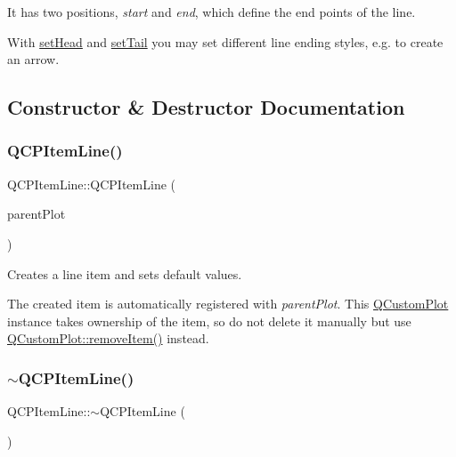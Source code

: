  It has two positions, {\itshape start} and {\itshape end}, which define the end points of the line.

With \hyperlink{class_q_c_p_item_line_aebf3d687114d584e0459db6759e2c3c3}{set\+Head} and \hyperlink{class_q_c_p_item_line_ac264222c3297a7efe33df9345c811a5f}{set\+Tail} you may set different line ending styles, e.\+g. to create an arrow. 

\subsection{Constructor \& Destructor Documentation}
\mbox{\label{class_q_c_p_item_line_a17804b7f64961c6accf25b61e85142e3}} 
\subsubsection{\texorpdfstring{Q\+C\+P\+Item\+Line()}{QCPItemLine()}}
{\footnotesize\ttfamily Q\+C\+P\+Item\+Line\+::\+Q\+C\+P\+Item\+Line (\begin{DoxyParamCaption}\item[{\hyperlink{class_q_custom_plot}{Q\+Custom\+Plot} $\ast$}]{parent\+Plot }\end{DoxyParamCaption})\hspace{0.3cm}{\ttfamily [explicit]}}

Creates a line item and sets default values.

The created item is automatically registered with {\itshape parent\+Plot}. This \hyperlink{class_q_custom_plot}{Q\+Custom\+Plot} instance takes ownership of the item, so do not delete it manually but use \hyperlink{class_q_custom_plot_ae04446557292551e8fb6e2c106e1848d}{Q\+Custom\+Plot\+::remove\+Item()} instead. \mbox{\label{class_q_c_p_item_line_a94b5aaae048171e5306dc4695b991283}} 
\subsubsection{\texorpdfstring{$\sim$\+Q\+C\+P\+Item\+Line()}{~QCPItemLine()}}
{\footnotesize\ttfamily Q\+C\+P\+Item\+Line\+::$\sim$\+Q\+C\+P\+Item\+Line (\begin{DoxyParamCaption}{ }\end{DoxyParamCaption})\hspace{0.3cm}{\ttfamily [virtual]}}



